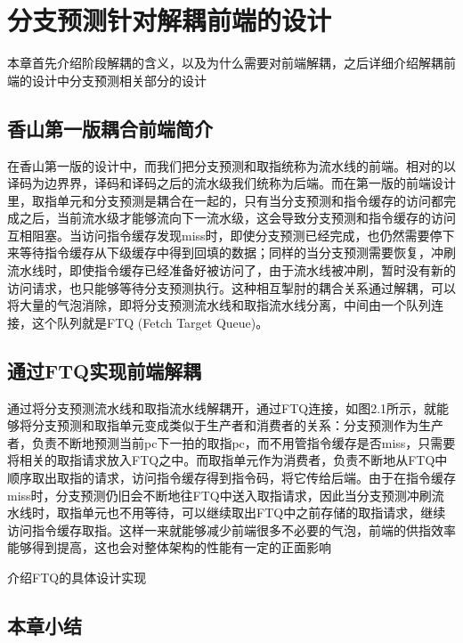 \chapter{分支预测针对解耦前端的设计}

本章首先介绍阶段解耦的含义，以及为什么需要对前端解耦，之后详细介绍解耦前端的设计中分支预测相关部分的设计

\section{香山第一版耦合前端简介}

在香山第一版的设计中，而我们把分支预测和取指统称为流水线的前端。相对的以译码为边界界，译码和译码之后的流水级我们统称为后端。而在第一版的前端设计里，取指单元和分支预测是耦合在一起的，只有当分支预测和指令缓存的访问都完成之后，当前流水级才能够流向下一流水级，这会导致分支预测和指令缓存的访问互相阻塞。当访问指令缓存发现miss时，即使分支预测已经完成，也仍然需要停下来等待指令缓存从下级缓存中得到回填的数据；同样的当分支预测需要恢复，冲刷流水线时，即使指令缓存已经准备好被访问了，由于流水线被冲刷，暂时没有新的访问请求，也只能够等待分支预测执行。这种相互掣肘的耦合关系通过解耦，可以将大量的气泡消除，即将分支预测流水线和取指流水线分离，中间由一个队列连接，这个队列就是FTQ (Fetch Target Queue)。

\section{通过FTQ实现前端解耦}

通过将分支预测流水线和取指流水线解耦开，通过FTQ连接，如图2.1所示，就能够将分支预测和取指单元变成类似于生产者和消费者的关系：分支预测作为生产者，负责不断地预测当前pc下一拍的取指pc，而不用管指令缓存是否miss，只需要将相关的取指请求放入FTQ之中。而取指单元作为消费者，负责不断地从FTQ中顺序取出取指的请求，访问指令缓存得到指令码，将它传给后端。由于在指令缓存miss时，分支预测仍旧会不断地往FTQ中送入取指请求，因此当分支预测冲刷流水线时，取指单元也不用等待，可以继续取出FTQ中之前存储的取指请求，继续访问指令缓存取指。这样一来就能够减少前端很多不必要的气泡，前端的供指效率能够得到提高，这也会对整体架构的性能有一定的正面影响

介绍FTQ的具体设计实现

\section{本章小结}

